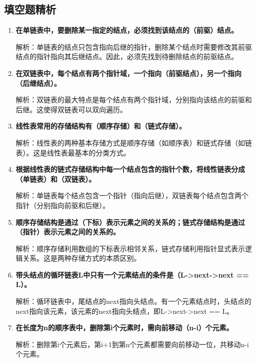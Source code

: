 \documentclass[12pt, a4paper]{article}
\begin{document}
\subsection{填空题精析}

\begin{enumerate}
	\item \textbf{在单链表中，要删除某一指定的结点，必须找到该结点的（前驱）结点。}

	      解析：单链表的结点只包含指向后继的指针，删除某个结点时需要修改其前驱结点的指针指向其后继结点。因此，必须先找到待删除结点的前驱结点。

	\item \textbf{在双链表中，每个结点有两个指针域，一个指向（前驱结点），另一个指向（后继结点）。}

	      解析：双链表的最大特点是每个结点有两个指针域，分别指向该结点的前驱和后继。这使得双链表可以双向遍历。

	\item \textbf{线性表常用的存储结构有（顺序存储）和（链式存储）。}

	      解析：线性表的两种基本存储方式是顺序存储（如顺序表）和链式存储（如链表）。这是线性表最基本的分类方式。

	\item \textbf{根据线性表的链式存储结构中每一个结点包含的指针个数，将线性链表分成（单链表）和（双链表）。}

	      解析：单链表每个结点包含一个指针（指向后继），双链表每个结点包含两个指针（分别指向前驱和后继）。

	\item \textbf{顺序存储结构是通过（下标）表示元素之间的关系的；链式存储结构是通过（指针）表示元素之间的关系的。}

	      解析：顺序存储利用数组的下标表示相邻关系，链式存储利用指针显式表示逻辑关系。这是两种存储方式的本质区别。

	\item \textbf{带头结点的循环链表L中只有一个元素结点的条件是（L->next->next == L）。}

	      解析：循环链表中，尾结点的next指向头结点。有一个元素结点时，头结点的next指向该元素，该元素的next指向头结点，即L->next->next == L。

	\item \textbf{在长度为n的顺序表中，删除第i个元素时，需向前移动（n-i）个元素。}

	      解析：删除第i个元素后，第i+1到第n个元素都需要向前移动一位，共移动n-i个元素。
\end{enumerate}
\end{document}
